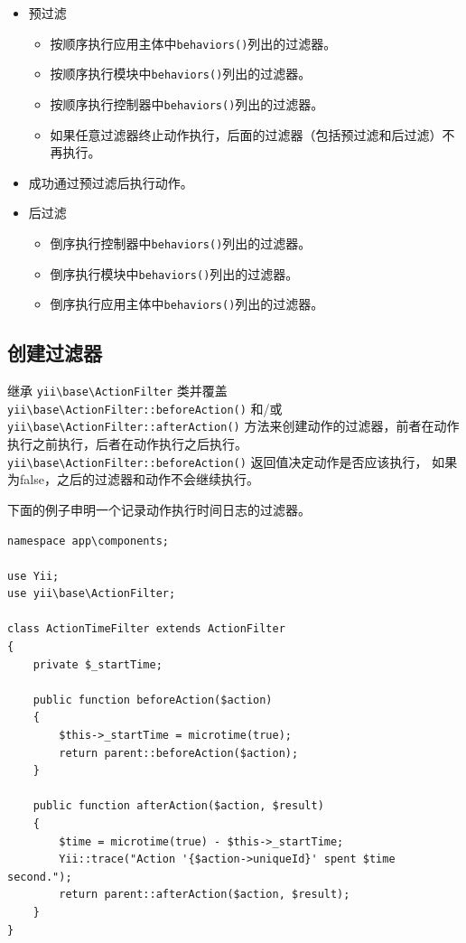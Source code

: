 \begin{itemize}
\item 预过滤\begin{itemize}
\item 按顺序执行应用主体中\lstinline|behaviors()|列出的过滤器。
\item 按顺序执行模块中\lstinline|behaviors()|列出的过滤器。
\item 按顺序执行控制器中\lstinline|behaviors()|列出的过滤器。
\item 如果任意过滤器终止动作执行，后面的过滤器（包括预过滤和后过滤）不再执行。
\end{itemize}

\item 成功通过预过滤后执行动作。
\item 后过滤\begin{itemize}
\item 倒序执行控制器中\lstinline|behaviors()|列出的过滤器。
\item 倒序执行模块中\lstinline|behaviors()|列出的过滤器。
\item 倒序执行应用主体中\lstinline|behaviors()|列出的过滤器。
\end{itemize}

\end{itemize}
\subsection{创建过滤器 \label{structure-filters.md::creating-filters}}
继承 \texttt{yii{\allowbreak{}\textbackslash}base{\allowbreak{}\textbackslash}ActionFilter} 类并覆盖
\texttt{yii{\allowbreak{}\textbackslash}base{\allowbreak{}\textbackslash}ActionFilter\allowbreak{}::\allowbreak{}beforeAction()} 和/或 \texttt{yii{\allowbreak{}\textbackslash}base{\allowbreak{}\textbackslash}ActionFilter\allowbreak{}::\allowbreak{}afterAction()}
方法来创建动作的过滤器，前者在动作执行之前执行，后者在动作执行之后执行。
\texttt{yii{\allowbreak{}\textbackslash}base{\allowbreak{}\textbackslash}ActionFilter\allowbreak{}::\allowbreak{}beforeAction()} 返回值决定动作是否应该执行，
如果为false，之后的过滤器和动作不会继续执行。

下面的例子申明一个记录动作执行时间日志的过滤器。

\lstset{language=php}\begin{lstlisting}
namespace app\components;

use Yii;
use yii\base\ActionFilter;

class ActionTimeFilter extends ActionFilter
{
    private $_startTime;

    public function beforeAction($action)
    {
        $this->_startTime = microtime(true);
        return parent::beforeAction($action);
    }

    public function afterAction($action, $result)
    {
        $time = microtime(true) - $this->_startTime;
        Yii::trace("Action '{$action->uniqueId}' spent $time second.");
        return parent::afterAction($action, $result);
    }
}
\end{lstlisting}
